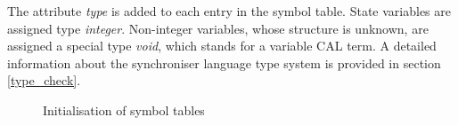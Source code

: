 The attribute \emph{type} is added to each entry in the symbol table. State variables are assigned type \emph{integer}. Non-integer variables, whose structure is unknown, are assigned a special type \emph{void}, which stands for a variable CAL term. A detailed information about the synchroniser language type system is provided in section \ref{type_check}.

\begin{figure}[h!]
\noindent{}
\caption{Initialisation of symbol tables\label{symtab_init}}
\end{figure}



